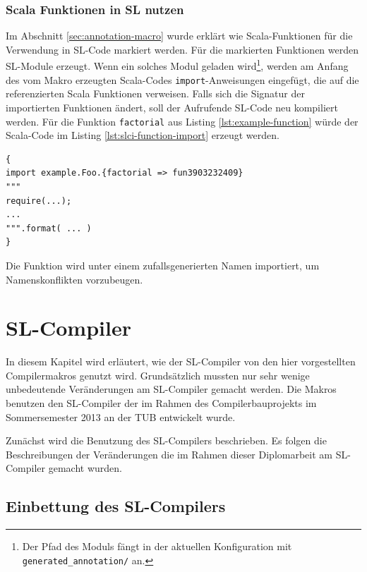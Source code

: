 \documentclass[12pt,bibtotoc]{scrreprt}
\begin{document}
\subsection{Scala Funktionen in SL nutzen}
\label{subsec:use-scala-function-in-sl}

Im Abschnitt \ref{sec:annotation-macro} wurde erklärt wie Scala-Funktionen für die Verwendung in \ac{SL}-Code markiert werden. Für die markierten Funktionen werden \ac{SL}-Module erzeugt. Wenn ein solches Modul geladen wird\footnote{Der Pfad des Moduls fängt in der aktuellen Konfiguration mit \lstinline!generated_annotation/! an.}, werden am Anfang des vom Makro erzeugten Scala-Codes \lstinline!import!-Anweisungen eingefügt, die auf die referenzierten Scala Funktionen verweisen. Falls sich die Signatur der importierten Funktionen ändert, soll der Aufrufende SL-Code neu kompiliert werden.
Für die Funktion \lstinline!factorial! aus Listing \ref{lst:example-function} würde der Scala-Code im Listing \ref{lst:slci-function-import} erzeugt werden.

\begin{lstlisting}[caption={Scala \lstinline!import!-Anweisung für eine annotierte Funktion}, label=lst:slci-function-import, float=h]
{
import example.Foo.{factorial => fun3903232409}
"""
require(...);
...
""".format( ... )
}
\end{lstlisting}

Die Funktion wird unter einem zufallsgenerierten Namen importiert, um Namenskonflikten vorzubeugen.

\chapter{SL-Compiler}
\label{chap:dom-monad-extensions}

In diesem Kapitel wird erläutert, wie der SL-Compiler von den hier vorgestellten Compilermakros genutzt wird. Grundsätzlich mussten nur sehr wenige unbedeutende Veränderungen am SL-Compiler gemacht werden. Die Makros benutzen den SL-Compiler der im Rahmen des Compilerbauprojekts im Sommersemester 2013 an der \ac{TUB} entwickelt wurde\cite{Bisping2013}.

Zunächst wird die Benutzung des SL-Compilers beschrieben. Es folgen die Beschreibungen der Veränderungen die im Rahmen dieser Diplomarbeit am SL-Compiler gemacht wurden.

\section{Einbettung des SL-Compilers}
\end{document}
